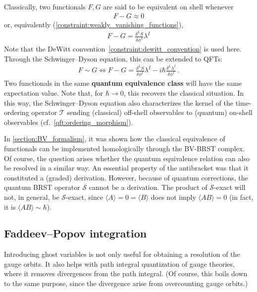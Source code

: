     \begin{property}
        Classically, two functionals $F,G$ are said to be equivalent on shell whenever
        \begin{gather}
            F-G \approx 0
        \end{gather}
        or, equivalently (\cref{constraint:weakly_vanishing_functions}),
        \begin{gather}
            F-G = \frac{\delta^LS}{\delta\phi^I}\lambda^I
        \end{gather}
        Note that the DeWitt convention~\eqref{constraint:dewitt_convention} is used here. Through the Schwinger--Dyson equation, this can be extended to QFTs:
        \begin{gather}
            F\sim G\iff F-G = \frac{\delta^LS}{\delta\phi^I}\lambda^I-i\hbar\frac{\delta^L\lambda^I}{\delta\phi^I}\,.
        \end{gather}
        Two functionals in the same \textbf{quantum equivalence class} will have the same expectation value. Note that, for $\hbar\longrightarrow0$, this recovers the classical situation. In this way, the Schwinger--Dyson equation also characterizes the kernel of the time-ordering operator $\mathcal{T}$ sending (classical) off-shell observables to (quantum) on-shell observables (cf.~\cref{qft:ordering_morphism}).
    \end{property}

    In \cref{section:BV_formalism}, it was shown how the classical equivalence of functionals can be implemented homologically through the BV-BRST complex. Of course, the question arises whether the quantum equivalence relation can also be resolved in a similar way. An essential property of the antibracket was that it constituted a (graded) derivation. However, because of quantum corrections, the quantum BRST operator $\mathcal{S}$ cannot be a derivation. The product of $\mathcal{S}$-exact will not, in general, be $\mathcal{S}$-exact, since $\langle A\rangle = 0 = \langle B\rangle$ does not imply $\langle AB \rangle=0$ (in fact, it is $\langle AB \rangle\sim\hbar$).

\subsection{Faddeev--Popov integration}

    Introducing ghost variables is not only useful for obtaining a resolution of the gauge orbits. It also helps with path integral quantization of gauge theories, where it removes divergences from the path integral. (Of course, this boils down to the same purpose, since the divergence arise from overcounting gauge orbits.)

